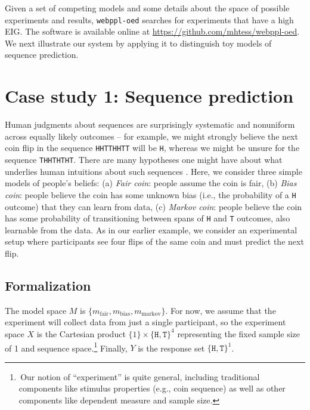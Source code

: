 \documentclass[10pt,letterpaper]{article}
\newcommand{\ndg}[1]{\textcolor{Green}{[ndg: #1]}}
\begin{document}
Given a set of competing models and some details about the space of possible experiments and results, \texttt{webppl-oed} searches for experiments that have a high EIG.
The software is available online at \break\url{https://github.com/mhtess/webppl-oed}.
We next illustrate our system by applying it to distinguish toy models of sequence prediction.

\section{Case study 1: Sequence prediction}
\label{s:tutorial}

Human judgments about sequences are surprisingly systematic and nonuniform across equally likely outcomes -- for example, we might strongly believe the next coin flip in the sequence \lstinline{HHTTHHTT} will be \lstinline{H}, whereas we might be unsure for the sequence \lstinline{THHTHTHT}.
There are many hypotheses one might have about what underlies human intuitions about such sequences \citep{goodfellow38:jep, falk81:pme, Griffiths2004_nips}.
Here, we consider three simple models of people's beliefs: (a) \emph{Fair coin}: people assume the coin is fair, (b) \emph{Bias coin}: people believe the coin has some unknown bias (i.e., the probability of a \lstinline{H} outcome) that they can learn from data, (c) \emph{Markov coin}: people believe the coin has some probability of transitioning between spans of \lstinline{H} and \lstinline{T} outcomes, also learnable from the data.
As in our earlier example, we consider an experimental setup where participants see four flips of the same coin and must predict the next flip.

\subsection{Formalization}

The model space $M$ is $\{m_{\text{fair}}, m_{\text{bias}}, m_{\text{markov}}\}$.
For now, we assume that the experiment will collect data from just a single participant, so the experiment space $X$ is the Cartesian product $\{1\} \times \{\texttt{H}, \texttt{T}\}^4$ representing the fixed sample size of 1 and sequence space.\footnote{\,Our notion of ``experiment'' is quite general, including traditional components like stimulus properties (e.g., coin sequence) as well as other components like dependent measure and sample size.}
Finally, $Y$ is the response set $\{\texttt{H}, \texttt{T}\}^1$.
\end{document}
